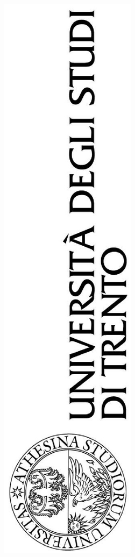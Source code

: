 \documentclass[12pt]{article}
\begin{document}
  \begin{titlepage}
    \centering
     \begin{figure}[ht]
       \centering
       \includegraphics[angle=-90, keepaspectratio=true, width=8cm]{logo.eps}

\end{figure}
\end{titlepage}
\end{document}
